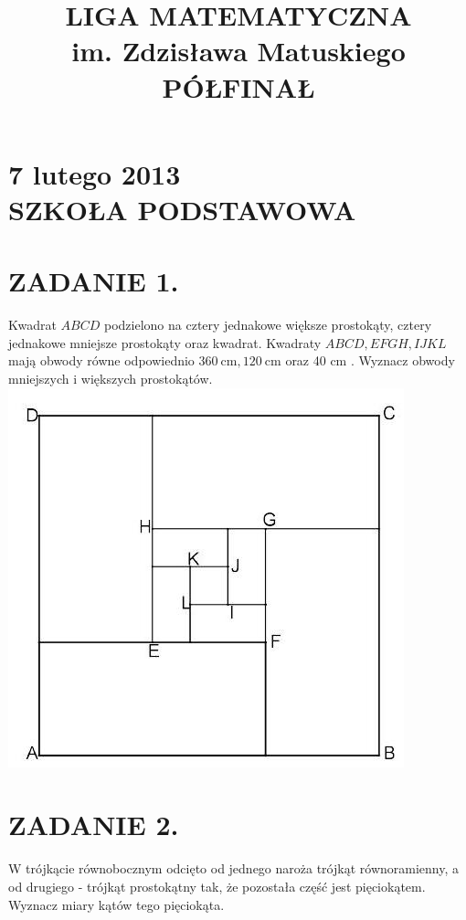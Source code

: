 \documentclass[10pt]{article}
\title{LIGA MATEMATYCZNA \\
 im. Zdzisława Matuskiego \\
 PÓŁFINAŁ }
\author{}
\date{}
\begin{document}
\maketitle
\section*{7 lutego 2013 \\
 SZKOŁA PODSTAWOWA}
\section*{ZADANIE 1.}
Kwadrat \(A B C D\) podzielono na cztery jednakowe większe prostokąty, cztery jednakowe mniejsze prostokąty oraz kwadrat. Kwadraty \(A B C D, E F G H, I J K L\) mają obwody równe odpowiednio \(360 \mathrm{~cm}, 120 \mathrm{~cm}\) oraz 40 cm . Wyznacz obwody mniejszych i większych prostokątów.\\
\includegraphics[max width=\textwidth, center]{2024_11_21_b57efd9a0a86eee00096g-1}

\section*{ZADANIE 2.}
W trójkącie równobocznym odcięto od jednego naroża trójkąt równoramienny, a od drugiego - trójkąt prostokątny tak, że pozostała część jest pięciokątem. Wyznacz miary kątów tego pięciokąta.
\end{document}
